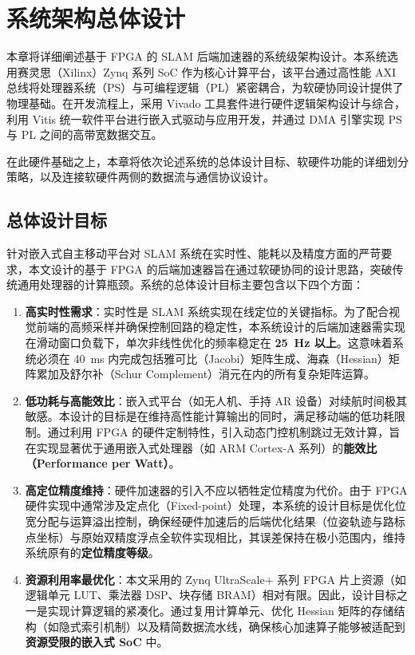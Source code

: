 \chapter{系统架构总体设计}\label{chap:architecture}

本章将详细阐述基于 FPGA 的 SLAM 后端加速器的系统级架构设计。本系统选用赛灵思（Xilinx）Zynq 系列 SoC 作为核心计算平台，该平台通过高性能 AXI 总线将处理器系统（PS）与可编程逻辑（PL）紧密耦合，为软硬协同设计提供了物理基础。在开发流程上，采用 Vivado 工具套件进行硬件逻辑架构设计与综合，利用 Vitis 统一软件平台进行嵌入式驱动与应用开发，并通过 DMA 引擎实现 PS 与 PL 之间的高带宽数据交互。

在此硬件基础之上，本章将依次论述系统的总体设计目标、软硬件功能的详细划分策略，以及连接软硬件两侧的数据流与通信协议设计。

\section{总体设计目标}

针对嵌入式自主移动平台对 SLAM 系统在实时性、能耗以及精度方面的严苛要求，本文设计的基于 FPGA 的后端加速器旨在通过软硬协同的设计思路，突破传统通用处理器的计算瓶颈。系统的总体设计目标主要包含以下四个方面：

\begin{enumerate}
    \item \textbf{高实时性需求}：实时性是 SLAM 系统实现在线定位的关键指标。为了配合视觉前端的高频采样并确保控制回路的稳定性，本系统设计的后端加速器需实现在滑动窗口负载下，单次非线性优化的频率稳定在 \textbf{25~Hz 以上}。这意味着系统必须在 40~ms 内完成包括雅可比（Jacobi）矩阵生成、海森（Hessian）矩阵累加及舒尔补（Schur Complement）消元在内的所有复杂矩阵运算。

    \item \textbf{低功耗与高能效比}：嵌入式平台（如无人机、手持 AR 设备）对续航时间极其敏感。本设计的目标是在维持高性能计算输出的同时，满足移动端的低功耗限制。通过利用 FPGA 的硬件定制特性，引入动态门控机制跳过无效计算，旨在实现显著优于通用嵌入式处理器（如 ARM Cortex-A 系列）的\textbf{能效比（Performance per Watt）}。

    \item \textbf{高定位精度维持}：硬件加速器的引入不应以牺牲定位精度为代价。由于 FPGA 硬件实现中通常涉及定点化（Fixed-point）处理，本系统的设计目标是优化位宽分配与运算溢出控制，确保经硬件加速后的后端优化结果（位姿轨迹与路标点坐标）与原始双精度浮点全软件实现相比，其误差保持在极小范围内，维持系统原有的\textbf{定位精度等级}。

    \item \textbf{资源利用率最优化}：本文采用的 Zynq UltraScale+ 系列 FPGA 片上资源（如逻辑单元 LUT、乘法器 DSP、块存储 BRAM）相对有限。因此，设计目标之一是实现计算逻辑的紧凑化。通过复用计算单元、优化 Hessian 矩阵的存储结构（如隐式索引机制）以及精简数据流水线，确保核心加速算子能够被适配到\textbf{资源受限的嵌入式 SoC} 中。
\end{enumerate}

